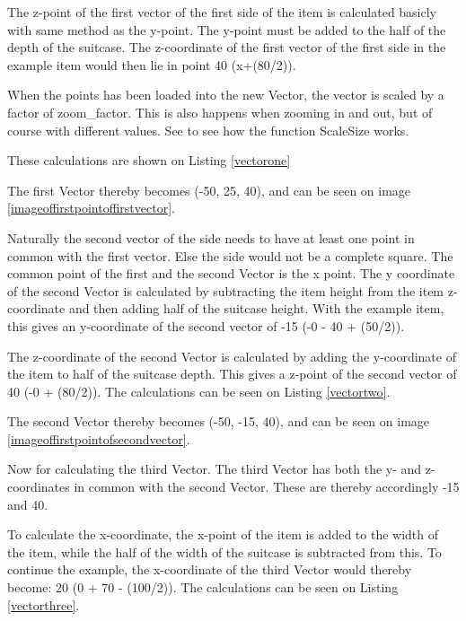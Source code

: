 The z-point of the first vector of the first side of the item is calculated basicly with same method as the y-point. The y-point must be added to the half of the depth of the suitcase. The z-coordinate of the first vector of the first side in the example item would then lie in point 40 (x+(80/2)).

When the points has been loaded into the new Vector, the vector is scaled by a factor of zoom\_factor. This is also happens when zooming in and out, but of course with different values. See  to see how the function ScaleSize works. 

These calculations are shown on Listing \ref{vectorone}


The first Vector thereby becomes (-50, 25, 40), and can be seen on image \ref{imageoffirstpointoffirstvector}.


Naturally the second vector of the side needs to have at least one point in common with the first vector. Else the side would not be a complete square. 
The common point of the first and the second Vector is the x point. 
The y coordinate of the second Vector is calculated by subtracting the item height from the item z-coordinate and then adding half of the suitcase height. With the example item, this gives an y-coordinate of the second vector of -15 (-0 - 40 + (50/2)).

The z-coordinate of the second Vector is calculated by adding the y-coordinate of the item to half of the suitcase depth. This gives a z-point of the second vector of 40 (-0 + (80/2)). The calculations can be seen on Listing \ref{vectortwo}.


The second Vector thereby becomes (-50, -15, 40), and can be seen on image \ref{imageoffirstpointofsecondvector}.

Now for calculating the third Vector. The third Vector has both the y- and z- coordinates in common with the second Vector. These are thereby accordingly -15 and 40. 

To calculate the x-coordinate, the x-point of the item is added to the width of the item, while the half of the width of the suitcase is subtracted from this. To continue the example, the x-coordinate of the third Vector would thereby become: 20 (0 + 70 - (100/2)). The calculations can be seen on Listing \ref{vectorthree}.

